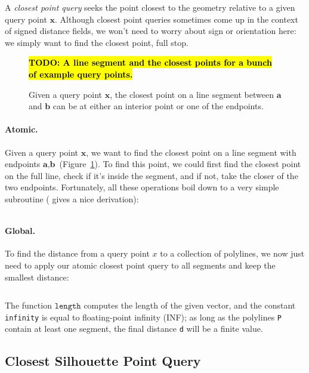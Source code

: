 \documentclass{article}
\newcommand{\code}[1]{\texttt{#1}}
\newcommand{\todo}[1]{\textbf{\hl{TODO: #1}}}
\renewcommand{\vec}[1]{\textbf{#1}}
\begin{document}
A \emph{closest point query} seeks the point closest to the geometry relative to a given query point \(\vec{x}\).  Although closest point queries sometimes come up in the context of signed distance fields, we won't need to worry about sign or orientation here: we simply want to find the closest point, full stop.

\begin{figure}[h!]
   \todo{A line segment and the closest points for a bunch of example query points.}
   \caption{Given a query point \(\vec{x}\), the closest point on a line segment between \(\vec{a}\) and \(\vec{b}\) can be at either an interior point or one of the endpoints.\label{fig:ClosestPointExamples}}
\end{figure}

\paragraph{Atomic.} Given a query point \(\vec{x}\), we want to find the closest point on a line segment with endpoints \(\vec{a}, \vec{b}\) (Figure~\ref{fig:ClosestPointExamples}).  To find this point, we could first find the closest point on the full line, check if it's inside the segment, and if not, take the closer of the two endpoints.  Fortunately, all these operations boil down to a very simple subroutine (\citet{Quilez:2020:SLS} gives a nice derivation):

\inputminted[fontsize=\small,linenos,firstline=36,lastline=41,bgcolor=bg]{cpp}{../code/WoStLaplace2D.cpp}

\paragraph{Global.} To find the distance from a query point \(x\) to a collection of polylines, we now just need to apply our atomic closest point query to all segments and keep the smallest distance:

\inputminted[fontsize=\small,linenos,firstline=65,lastline=75,bgcolor=bg]{cpp}{../code/WoStLaplace2D.cpp}
The function \(\code{length}\) computes the length of the given vector, and the constant \code{infinity} is equal to floating-point infinity (INF); as long as the polylines \code{P} contain at least one segment, the final distance \code{d} will be a finite value.

\subsection{Closest Silhouette Point Query}
\label{sec:ClosestSilhouettePointQuery}
\end{document}
